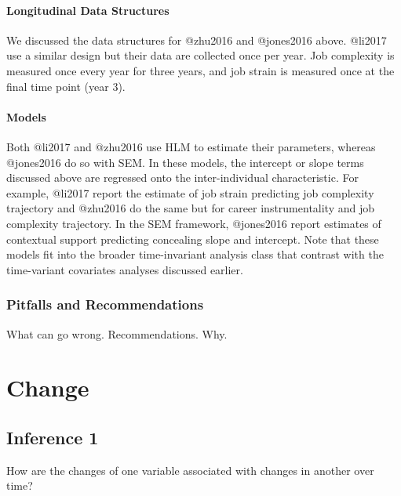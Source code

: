 \documentclass[]{article}
\let\oldparagraph\paragraph
\renewcommand{\paragraph}[1]{\oldparagraph{#1}\mbox{}}
\begin{document}
\hypertarget{longitudinal-data-structures}{%
\paragraph{Longitudinal Data
Structures}\label{longitudinal-data-structures}}

We discussed the data structures for @zhu2016 and @jones2016 above.
@li2017 use a similar design but their data are collected once per year.
Job complexity is measured once every year for three years, and job
strain is measured once at the final time point (year 3).

\hypertarget{models-5}{%
\paragraph{Models}\label{models-5}}

Both @li2017 and @zhu2016 use HLM to estimate their parameters, whereas
@jones2016 do so with SEM. In these models, the intercept or slope terms
discussed above are regressed onto the inter-individual characteristic.
For example, @li2017 report the estimate of job strain predicting job
complexity trajectory and @zhu2016 do the same but for career
instrumentality and job complexity trajectory. In the SEM framework,
@jones2016 report estimates of contextual support predicting concealing
slope and intercept. Note that these models fit into the broader
time-invariant analysis class that contrast with the time-variant
covariates analyses discussed earlier.

\hypertarget{pitfalls-and-recommendations-5}{%
\subsubsection{Pitfalls and
Recommendations}\label{pitfalls-and-recommendations-5}}

What can go wrong. Recommendations. Why.

\hypertarget{change}{%
\section{Change}\label{change}}

\hypertarget{inference-1-2}{%
\subsection{Inference 1}\label{inference-1-2}}

How are the changes of one variable associated with changes in another
over time?
\end{document}
